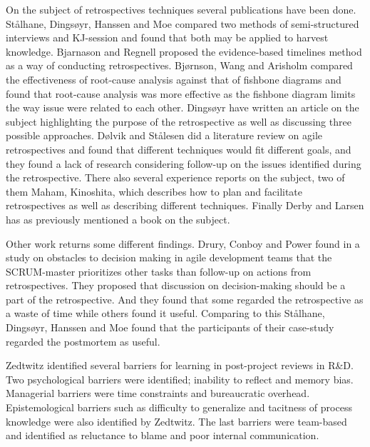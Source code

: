 On the subject of retrospectives techniques several publications have been done. Stålhane, Dingsøyr, Hanssen and Moe\cite{Hanssen2003} compared two methods of semi-structured interviews and KJ-session and found that both may be applied to harvest knowledge. Bjarnason and Regnell\cite{Bjarnason2012} proposed the evidence-based timelines method as a way of conducting retrospectives. Bjørnson, Wang and Arisholm\cite{bjornson2009} compared the effectiveness of root-cause analysis against that of fishbone diagrams and found that root-cause analysis was more effective as the fishbone diagram limits the way issue were related to each other. Dingsøyr\cite{Dingsoyr2004} have written an article on the subject highlighting the purpose of the retrospective as well as discussing three possible approaches. Dølvik and Stålesen\cite{Dolvik2014} did a literature review on agile retrospectives and found that different techniques would fit different goals, and they found a lack of research considering follow-up on the issues identified during the retrospective. There also several experience reports on the subject, two of them Maham\cite{Maham2008}, Kinoshita\cite{Kinoshita2008}, which describes how to plan and facilitate retrospectives as well as describing different techniques. Finally Derby and Larsen\cite{Larsen2006} has as previously mentioned a book on the subject. 

Other work returns some different findings. Drury, Conboy and Power\cite{Drury2012} found in a study on obstacles to decision making in agile development teams that the SCRUM-master prioritizes other tasks than follow-up on actions from retrospectives. They proposed that discussion on decision-making should be a part of the retrospective. And they found that some regarded the retrospective as a waste of time while others found it useful. Comparing to this Stålhane, Dingsøyr, Hanssen and Moe\cite{Hanssen2003} found that the participants of their case-study regarded the postmortem as useful. 

Zedtwitz\cite{Zedtwitz2002} identified several barriers for learning in post-project reviews in R\&D. Two psychological barriers were identified; inability to reflect and memory bias. Managerial barriers were time constraints and bureaucratic overhead. Epistemological barriers such as difficulty to generalize and tacitness of process knowledge were also identified by Zedtwitz. The last barriers were team-based and identified as reluctance to blame and poor internal communication. 
